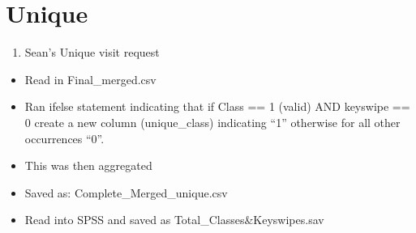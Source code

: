 \documentclass[
]{book}
\newenvironment{Shaded}{\begin{snugshade}}{\end{snugshade}}
\newcommand{\CommentTok}[1]{\textcolor[rgb]{0.56,0.35,0.01}{\textit{#1}}}
\newcommand{\DecValTok}[1]{\textcolor[rgb]{0.00,0.00,0.81}{#1}}
\newcommand{\KeywordTok}[1]{\textcolor[rgb]{0.13,0.29,0.53}{\textbf{#1}}}
\newcommand{\NormalTok}[1]{#1}
\newcommand{\OperatorTok}[1]{\textcolor[rgb]{0.81,0.36,0.00}{\textbf{#1}}}
\newcommand{\StringTok}[1]{\textcolor[rgb]{0.31,0.60,0.02}{#1}}
\providecommand{\tightlist}{%
  \setlength{\itemsep}{0pt}\setlength{\parskip}{0pt}}
\begin{document}
\hypertarget{unique}{%
\chapter{Unique}\label{unique}}

\begin{enumerate}
\def\labelenumi{\alph{enumi}.}
\tightlist
\item
  Sean's Unique visit request
\end{enumerate}

\begin{itemize}
\tightlist
\item
  Read in Final\_merged.csv
\item
  Ran ifelse statement indicating that if Class == 1 (valid) AND keyswipe == 0 create a new column (unique\_class) indicating ``1'' otherwise for all other occurrences ``0''.
\item
  This was then aggregated
\item
  Saved as: Complete\_Merged\_unique.csv
\item
  Read into SPSS and saved as Total\_Classes\&Keyswipes.sav
\end{itemize}

\begin{Shaded}
\end{Shaded}

  
\end{document}

